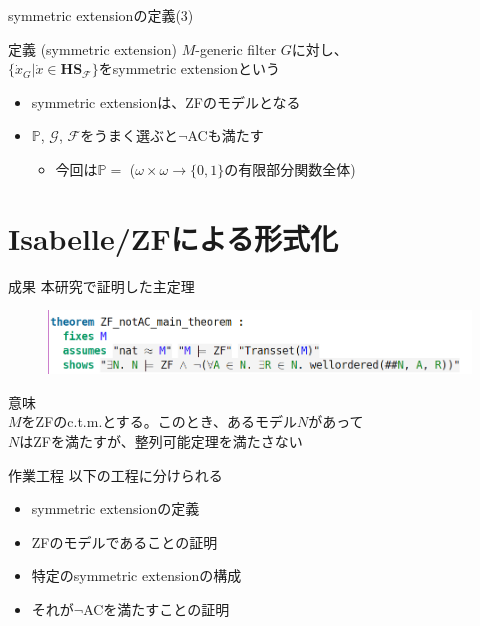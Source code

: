 \documentclass[17pt,aspectratio=169]{beamer}
\newcommand{\Pbb}{\mathbb{P}}
\newcommand{\Gcal}{\mathcal{G}}
\newcommand{\Fcal}{\mathcal{F}}
\begin{document}
\begin{frame}{symmetric extensionの定義(3)}
    \begin{itembox}[l]{定義 (symmetric extension)}
        {\small
            $M$-generic filter $G$に対し、\\$\{ \dot{x}_G | \dot{x} \in \bm{\mathbf{HS}}_{\Fcal} \}$をsymmetric extensionという
        }
    \end{itembox}

    \begin{itemize}
        \item symmetric extensionは、ZFのモデルとなる
        \item $\Pbb$, $\Gcal$, $\Fcal$をうまく選ぶと$\neg$ACも満たす
        {\small \begin{itemize}
            \item 今回は$\Pbb =$ ($\omega \times \omega \rightarrow \{0,1\}$の有限部分関数全体)
        \end{itemize} }
    \end{itemize}
\end{frame}

\section {Isabelle/ZFによる形式化}

\begin{frame}{成果}
    本研究で証明した主定理
    \vspace{-1cm}
    \hspace{-1.5cm}
    \begin{figure}
        \includegraphics[width=1.1\linewidth]{./images/ZF_notAC_main_theorem.png}
    \end{figure}

    \vspace{-5pt}
    意味 \\
    {\small
    \hspace{1cm} $M$をZFのc.t.m.とする。このとき、あるモデル$N$があって\\
    \hspace{1cm} $N$はZFを満たすが、整列可能定理を満たさない
    }
\end{frame}

\begin{frame}{作業工程}
    以下の工程に分けられる
    {\small
    \begin{itemize}[itemsep=8pt]
        \item symmetric extensionの定義
        \item ZFのモデルであることの証明
        \item 特定のsymmetric extensionの構成
        \item それが$\neg$ACを満たすことの証明
    \end{itemize} }
\end{frame}
\end{document}
